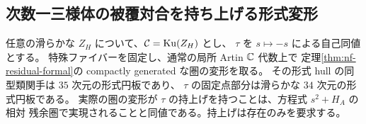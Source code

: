 \subsection{次数一三様体の被覆対合を持ち上げる形式変形}
\label{nft:sec:deck-formal}
\begin{theorem}\label{nft:thm:deck-formal}
任意の滑らかな $Z_H$ について、$\mathcal C=\operatorname{Ku}(Z_H)$ とし、
$\tau$ を $s\mapsto-s$ による自己同値とする。
特殊ファイバーを固定し、通常の局所 Artin $\mathbb C$ 代数上で
定理\ref{thm:nf-residual-formal}の compactly generated な圏の変形を取る。
その形式 hull の同型類関手は $35$ 次元の形式円板であり、
$\tau$ の固定点部分は滑らかな $34$ 次元の形式円板である。
実際の圏の変形が $\tau$ の持上げを持つことは、方程式 $s^2+H_A$ の相対
残余圏で実現されることと同値である。持上げは存在のみを要求する。
\end{theorem}

